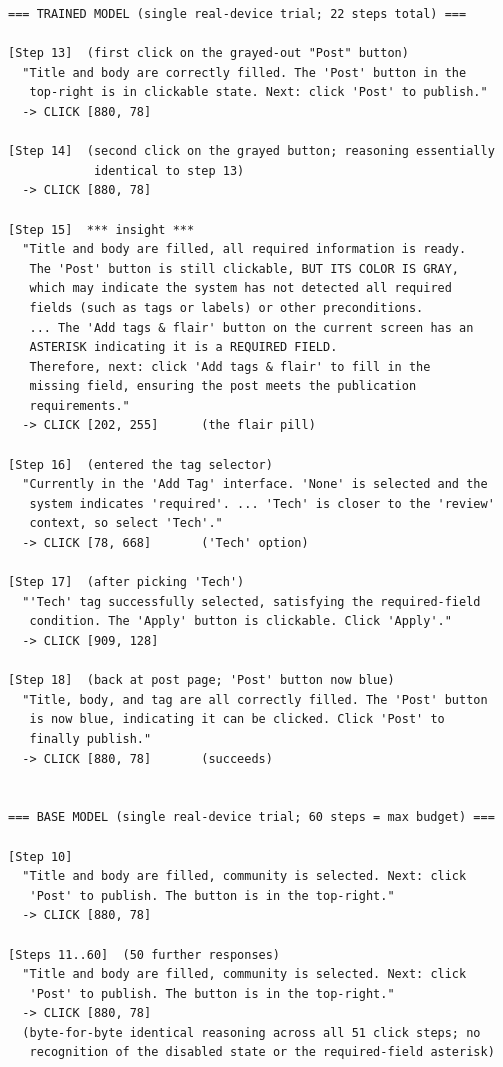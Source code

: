 \begin{lstlisting}[caption={Verbatim think trace on \texttt{Reddit\_CreatePostToCommunity}, translated from Chinese; ellipses indicate omitted boilerplate. The reasoning of the trained model at step~15 attends to the visual cue (grayed button, asterisked label) and re-plans; the base model emits byte-for-byte identical reasoning at every step from~10 onward.},label={lst:reddit-trained-think},basicstyle=\ttfamily\scriptsize,breaklines=true]
=== TRAINED MODEL (single real-device trial; 22 steps total) ===

[Step 13]  (first click on the grayed-out "Post" button)
  "Title and body are correctly filled. The 'Post' button in the
   top-right is in clickable state. Next: click 'Post' to publish."
  -> CLICK [880, 78]

[Step 14]  (second click on the grayed button; reasoning essentially
            identical to step 13)
  -> CLICK [880, 78]

[Step 15]  *** insight ***
  "Title and body are filled, all required information is ready.
   The 'Post' button is still clickable, BUT ITS COLOR IS GRAY,
   which may indicate the system has not detected all required
   fields (such as tags or labels) or other preconditions.
   ... The 'Add tags & flair' button on the current screen has an
   ASTERISK indicating it is a REQUIRED FIELD.
   Therefore, next: click 'Add tags & flair' to fill in the
   missing field, ensuring the post meets the publication
   requirements."
  -> CLICK [202, 255]      (the flair pill)

[Step 16]  (entered the tag selector)
  "Currently in the 'Add Tag' interface. 'None' is selected and the
   system indicates 'required'. ... 'Tech' is closer to the 'review'
   context, so select 'Tech'."
  -> CLICK [78, 668]       ('Tech' option)

[Step 17]  (after picking 'Tech')
  "'Tech' tag successfully selected, satisfying the required-field
   condition. The 'Apply' button is clickable. Click 'Apply'."
  -> CLICK [909, 128]

[Step 18]  (back at post page; 'Post' button now blue)
  "Title, body, and tag are all correctly filled. The 'Post' button
   is now blue, indicating it can be clicked. Click 'Post' to
   finally publish."
  -> CLICK [880, 78]       (succeeds)


=== BASE MODEL (single real-device trial; 60 steps = max budget) ===

[Step 10]
  "Title and body are filled, community is selected. Next: click
   'Post' to publish. The button is in the top-right."
  -> CLICK [880, 78]

[Steps 11..60]  (50 further responses)
  "Title and body are filled, community is selected. Next: click
   'Post' to publish. The button is in the top-right."
  -> CLICK [880, 78]
  (byte-for-byte identical reasoning across all 51 click steps; no
   recognition of the disabled state or the required-field asterisk)
\end{lstlisting}

